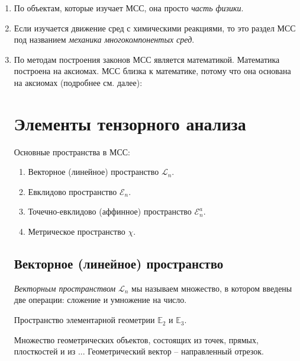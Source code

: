 \begin{enumerate}
  \item По объектам, которые изучает МСС, она просто \textsl{часть физики}.
  \item Если изучается движение сред с химическими реакциями, то это раздел МСС
    под названием
    \emph{механика
  многокомпонентых сред}.
  \item По методам построения законов МСС является математикой. Математика построена на аксиомах.
    МСС близка к математике, потому что она основана на аксиомах (подробнее см.
    далее):



\section{Элементы тензорного анализа}
Основные пространства в МСС:
\begin{enumerate}
  \item Векторное (линейное) пространство $\mathcal{L}_n$.  
  \item Евклидово пространство $\mathcal{E}_n$.
  \item Точечно-евклидово (аффинное) пространство $\mathcal{E}_n^a$.
  \item Метрическое пространство $ \chi $.
\end{enumerate}


\subsection{Векторное (линейное) пространство}
\begin{definition}
  \emph{Векторным пространством} $\mathcal{L}_n$ мы называем множество, в котором введены две операции: сложение и
  умножение на число.
\end{definition}

\begin{example}
  Пространство элементарной геометрии $\mathbb{E}_2$ и $\mathbb{E}_3$.

  Множество геометрических объектов, состоящих из точек, прямых, плосткостей и из ... Геометрический
  вектор -- направленный отрезок.


\end{example}
\end{enumerate}
